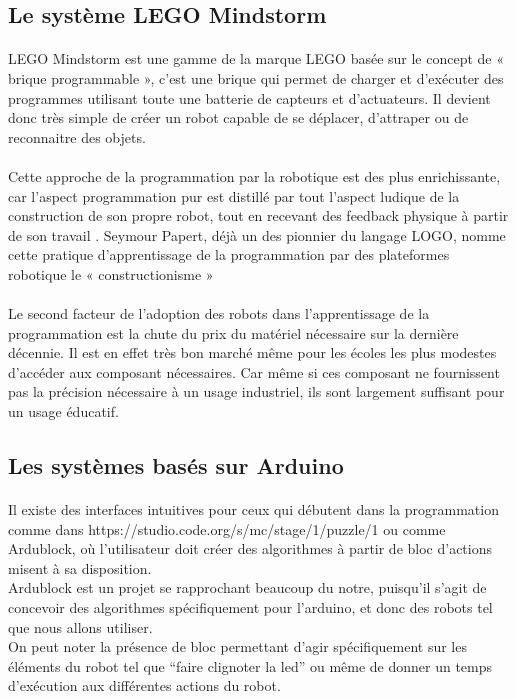\documentclass[a4paper]{article}
\begin{document}
\subsection{Le système LEGO Mindstorm}

\paragraph{}
LEGO Mindstorm est une gamme de la marque LEGO basée sur le concept de « brique programmable », c’est une brique qui permet de charger et d’exécuter des programmes utilisant toute une batterie de capteurs et d’actuateurs. Il devient donc très simple de créer un robot capable de se déplacer, d’attraper ou de reconnaitre des objets. \cite{martin1993lego}

\paragraph{}
Cette approche de la programmation par la robotique est des plus enrichissante, car l’aspect programmation pur est distillé par tout l’aspect ludique de la construction de son propre robot, tout en recevant des feedback physique à partir de son travail \cite{weinberg2003robotics}. Seymour Papert, déjà un des pionnier du langage LOGO, nomme cette pratique d’apprentissage de la programmation par des plateformes robotique le « constructionisme » \cite{Papert:1980:MCC:1095592}

\paragraph{}
Le second facteur de l’adoption des robots dans l’apprentissage de la programmation est la chute du prix du matériel nécessaire sur la dernière décennie. Il est en effet très bon marché même pour les écoles les plus modestes d’accéder aux composant nécessaires. Car même si ces composant ne fournissent pas la précision nécessaire à un usage industriel, ils sont largement suffisant pour un usage éducatif.

\subsection{Les systèmes basés sur Arduino}

\paragraph{}
Il existe des interfaces intuitives pour ceux qui débutent dans la programmation comme dans https://studio.code.org/s/mc/stage/1/puzzle/1 ou comme Ardublock, où l’utilisateur doit créer des algorithmes à partir de bloc d’actions misent à sa disposition.\\
Ardublock est un projet se rapprochant beaucoup du notre, puisqu’il s’agit de concevoir des algorithmes spécifiquement pour l’arduino, et donc des robots tel que nous allons utiliser. \\
On peut noter la présence de bloc permettant d’agir spécifiquement sur les éléments du robot tel que “faire clignoter la led” ou même de donner un temps d'exécution aux différentes actions du robot.
\end{document}
